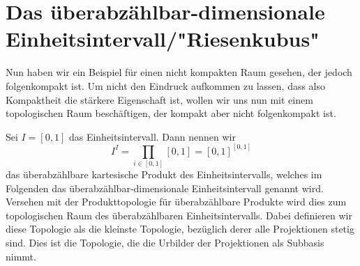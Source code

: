 \documentclass[11pt]{scrartcl}
\begin{document}
\section{Das überabzählbar-dimensionale Einheitsintervall/"Riesenkubus"}
Nun haben wir ein Beispiel für einen nicht kompakten Raum gesehen, der jedoch folgenkompakt ist.
Um nicht den Eindruck aufkommen zu lassen, dass also Kompaktheit die stärkere Eigenschaft ist,
wollen wir uns nun mit einem topologischen Raum beschäftigen, der kompakt aber nicht folgenkompakt ist.
\begin{definition}
	Sei $I=[0,1]$ das Einheitsintervall. Dann nennen wir $$I^I=\prod_{i\in [0,1]}[0,1]=[0,1]^{[0,1]}$$ das 
	überabzählbare kartesische Produkt des Einheitsintervalls, welches im Folgenden das überabzählbar-dimensionale Einheitsintervall genannt wird. 
	Versehen mit der Produkttopologie für überabzählbare Produkte wird dies zum topologischen
	Raum des überabzählbaren Einheitsintervalls. Dabei definieren wir diese Topologie als die kleinste Topologie, bezüglich derer alle 
	Projektionen stetig sind. Dies ist die Topologie, die die Urbilder der Projektionen als Subbasis nimmt.
\end{definition}
\end{document}
